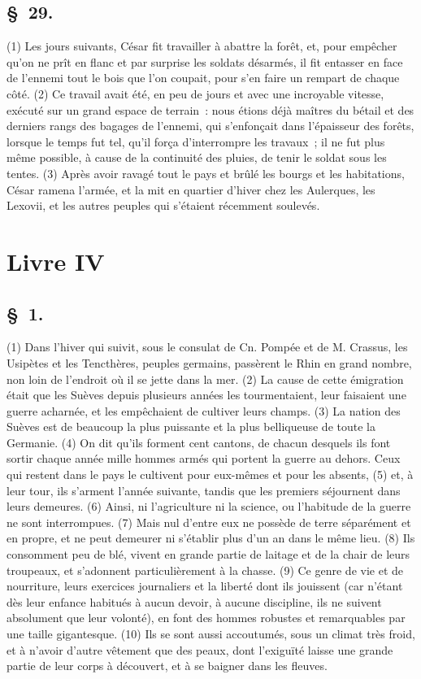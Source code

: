 \documentclass[french,twoside]{book} %
\begin{document}
\subsection[{§ 29.}]{ \textsc{§ 29.} }
\noindent (1) Les jours suivants, César fit travailler à abattre la forêt, et, pour empêcher qu’on ne prît en flanc et par surprise les soldats désarmés, il fit entasser en face de l’ennemi tout le bois que l’on coupait, pour s’en faire un rempart de chaque côté. (2) Ce travail avait été, en peu de jours et avec une incroyable vitesse, exécuté sur un grand espace de terrain : nous étions déjà maîtres du bétail et des derniers rangs des bagages de l’ennemi, qui s’enfonçait dans l’épaisseur des forêts, lorsque le temps fut tel, qu’il força d’interrompre les travaux ; il ne fut plus même possible, à cause de la continuité des pluies, de tenir le soldat sous les tentes. (3) Après avoir ravagé tout le pays et brûlé les bourgs et les habitations, César ramena l’armée, et la mit en quartier d’hiver chez les Aulerques, les Lexovii, et les autres peuples qui s’étaient récemment soulevés.
\section[{Livre IV}]{Livre IV}\renewcommand{\leftmark}{Livre IV}

\subsection[{§ 1.}]{ \textsc{§ 1.} }
\noindent (1) Dans l’hiver qui suivit, sous le consulat de Cn. Pompée et de M. Crassus, les Usipètes et les Tencthères, peuples germains, passèrent le Rhin en grand nombre, non loin de l’endroit où il se jette dans la mer. (2) La cause de cette émigration était que les Suèves depuis plusieurs années les tourmentaient, leur faisaient une guerre acharnée, et les empêchaient de cultiver leurs champs. (3) La nation des Suèves est de beaucoup la plus puissante et la plus belliqueuse de toute la Germanie. (4) On dit qu’ils forment cent cantons, de chacun desquels ils font sortir chaque année mille hommes armés qui portent la guerre au dehors. Ceux qui restent dans le pays le cultivent pour eux-mêmes et pour les absents, (5) et, à leur tour, ils s’arment l’année suivante, tandis que les premiers séjournent dans leurs demeures. (6) Ainsi, ni l’agriculture ni la science, ou l’habitude de la guerre ne sont interrompues. (7) Mais nul d’entre eux ne possède de terre séparément et en propre, et ne peut demeurer ni s’établir plus d’un an dans le même lieu. (8) Ils consomment peu de blé, vivent en grande partie de laitage et de la chair de leurs troupeaux, et s’adonnent particulièrement à la chasse. (9) Ce genre de vie et de nourriture, leurs exercices journaliers et la liberté dont ils jouissent (car n’étant dès leur enfance habitués à aucun devoir, à aucune discipline, ils ne suivent absolument que leur volonté), en font des hommes robustes et remarquables par une taille gigantesque. (10) Ils se sont aussi accoutumés, sous un climat très froid, et à n’avoir d’autre vêtement que des peaux, dont l’exiguïté laisse une grande partie de leur corps à découvert, et à se baigner dans les fleuves.
\end{document}
